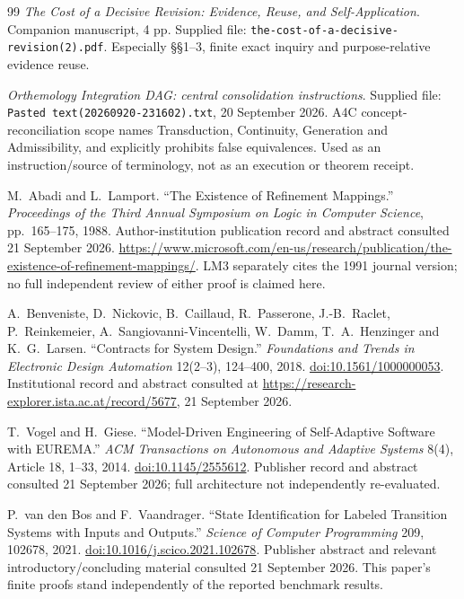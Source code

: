 \begin{thebibliography}{99}
 \textit{The Cost of a Decisive Revision: Evidence, Reuse, and Self-Application}. Companion manuscript, 4 pp. Supplied file: \texttt{the-cost-of-a-decisive-revision(2).pdf}. Especially \S\S1--3, finite exact inquiry and purpose-relative evidence reuse.

 \textit{Orthemology Integration DAG: central consolidation instructions}. Supplied file: \texttt{Pasted text(20260920-231602).txt}, 20 September 2026. A4C concept-reconciliation scope names Transduction, Continuity, Generation and Admissibility, and explicitly prohibits false equivalences. Used as an instruction/source of terminology, not as an execution or theorem receipt.

 M.~Abadi and L.~Lamport. ``The Existence of Refinement Mappings.'' \textit{Proceedings of the Third Annual Symposium on Logic in Computer Science}, pp.~165--175, 1988. Author-institution publication record and abstract consulted 21 September 2026. \url{https://www.microsoft.com/en-us/research/publication/the-existence-of-refinement-mappings/}. LM3 separately cites the 1991 journal version; no full independent review of either proof is claimed here.

 A.~Benveniste, D.~Nickovic, B.~Caillaud, R.~Passerone, J.-B.~Raclet, P.~Reinkemeier, A.~Sangiovanni-Vincentelli, W.~Damm, T.~A.~Henzinger and K.~G.~Larsen. ``Contracts for System Design.'' \textit{Foundations and Trends in Electronic Design Automation} 12(2--3), 124--400, 2018. \href{https://doi.org/10.1561/1000000053}{doi:10.1561/1000000053}. Institutional record and abstract consulted at \url{https://research-explorer.ista.ac.at/record/5677}, 21 September 2026.

 T.~Vogel and H.~Giese. ``Model-Driven Engineering of Self-Adaptive Software with EUREMA.'' \textit{ACM Transactions on Autonomous and Adaptive Systems} 8(4), Article 18, 1--33, 2014. \href{https://doi.org/10.1145/2555612}{doi:10.1145/2555612}. Publisher record and abstract consulted 21 September 2026; full architecture not independently re-evaluated.

 P.~van den Bos and F.~Vaandrager. ``State Identification for Labeled Transition Systems with Inputs and Outputs.'' \textit{Science of Computer Programming} 209, 102678, 2021. \href{https://doi.org/10.1016/j.scico.2021.102678}{doi:10.1016/j.scico.2021.102678}. Publisher abstract and relevant introductory/concluding material consulted 21 September 2026. This paper's finite proofs stand independently of the reported benchmark results.


\end{thebibliography}
